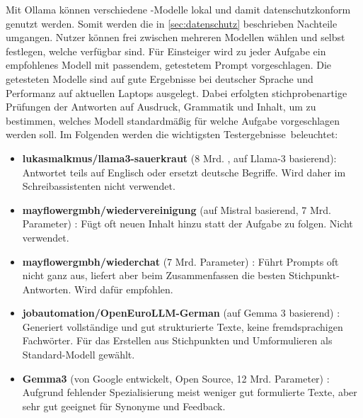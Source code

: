 \documentclass[../main.tex]{subfiles}
\begin{document}
Mit Ollama können verschiedene -Modelle lokal und damit datenschutzkonform genutzt werden. Somit werden die in \autoref{sec:datenschutz} beschrieben Nachteile umgangen. 
Nutzer können frei zwischen mehreren Modellen wählen und selbst festlegen, welche verfügbar sind. Für Einsteiger wird zu jeder Aufgabe ein empfohlenes Modell mit passendem, 
getestetem Prompt vorgeschlagen. Die getesteten Modelle sind auf gute Ergebnisse bei deutscher Sprache und Performanz auf aktuellen Laptops ausgelegt. Dabei erfolgten stichprobenartige 
Prüfungen der Antworten auf Ausdruck, Grammatik und Inhalt, um zu bestimmen, welches Modell standardmäßig für welche Aufgabe vorgeschlagen werden soll. Im Folgenden werden die wichtigsten \mbox{Testergebnisse beleuchtet:}

\begin{itemize} \item \textbf{lukasmalkmus/llama3-sauerkraut} (8 Mrd. , auf Llama-3 basierend)\cite{sauerkraut}: Antwortet teils auf Englisch oder ersetzt deutsche Begriffe. Wird daher im Schreibassistenten nicht verwendet.

\item \textbf{mayflowergmbh/wiedervereinigung} (auf Mistral basierend, 7 Mrd. Parameter) \cite{wiedervereinigung}: Fügt oft neuen Inhalt hinzu statt der Aufgabe zu folgen. Nicht verwendet.

\item \textbf{mayflowergmbh/wiederchat} (7 Mrd. Parameter) \cite{wiederchat}: Führt Prompts oft nicht ganz aus, liefert aber beim Zusammenfassen die besten Stichpunkt-Antworten. Wird dafür empfohlen.

\item \textbf{jobautomation/OpenEuroLLM-German} (auf Gemma 3 basierend) \cite{openeurollm}: Generiert vollständige und gut strukturierte Texte, keine fremdsprachigen Fachwörter. Für das Erstellen aus Stichpunkten und Umformulieren als Standard-Modell gewählt.

\item \textbf{Gemma3} (von Google entwickelt, Open Source, 12 Mrd. Parameter) \cite{gemma3}: Aufgrund fehlender Spezialisierung meist weniger gut formulierte Texte, aber sehr gut geeignet für Synonyme und Feedback. \end{itemize}
\end{document}
